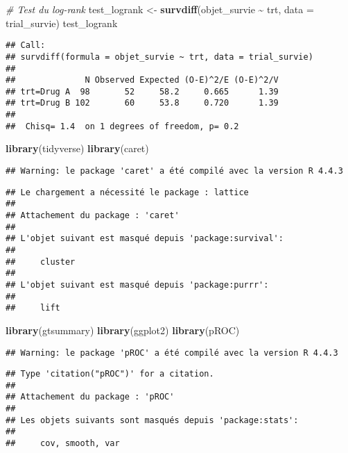 \documentclass[
]{article}
\newenvironment{Shaded}{\begin{snugshade}}{\end{snugshade}}
\newcommand{\AttributeTok}[1]{\textcolor[rgb]{0.13,0.29,0.53}{#1}}
\newcommand{\CommentTok}[1]{\textcolor[rgb]{0.56,0.35,0.01}{\textit{#1}}}
\newcommand{\FunctionTok}[1]{\textcolor[rgb]{0.13,0.29,0.53}{\textbf{#1}}}
\newcommand{\NormalTok}[1]{#1}
\newcommand{\OtherTok}[1]{\textcolor[rgb]{0.56,0.35,0.01}{#1}}
\newcommand{\SpecialCharTok}[1]{\textcolor[rgb]{0.81,0.36,0.00}{\textbf{#1}}}
\begin{document}
\begin{Shaded}
\begin{Highlighting}[]
\CommentTok{\# Test du log{-}rank}
\NormalTok{test\_logrank }\OtherTok{\textless{}{-}} \FunctionTok{survdiff}\NormalTok{(objet\_survie }\SpecialCharTok{\textasciitilde{}}\NormalTok{ trt, }\AttributeTok{data =}\NormalTok{ trial\_survie)}
\NormalTok{test\_logrank}
\end{Highlighting}
\end{Shaded}

\begin{verbatim}
## Call:
## survdiff(formula = objet_survie ~ trt, data = trial_survie)
## 
##              N Observed Expected (O-E)^2/E (O-E)^2/V
## trt=Drug A  98       52     58.2     0.665      1.39
## trt=Drug B 102       60     53.8     0.720      1.39
## 
##  Chisq= 1.4  on 1 degrees of freedom, p= 0.2
\end{verbatim}

\begin{Shaded}
\begin{Highlighting}[]
\FunctionTok{library}\NormalTok{(tidyverse)}
\FunctionTok{library}\NormalTok{(caret)}
\end{Highlighting}
\end{Shaded}

\begin{verbatim}
## Warning: le package 'caret' a été compilé avec la version R 4.4.3
\end{verbatim}

\begin{verbatim}
## Le chargement a nécessité le package : lattice
## 
## Attachement du package : 'caret'
## 
## L'objet suivant est masqué depuis 'package:survival':
## 
##     cluster
## 
## L'objet suivant est masqué depuis 'package:purrr':
## 
##     lift
\end{verbatim}

\begin{Shaded}
\begin{Highlighting}[]
\FunctionTok{library}\NormalTok{(gtsummary)}
\FunctionTok{library}\NormalTok{(ggplot2)}
\FunctionTok{library}\NormalTok{(pROC)}
\end{Highlighting}
\end{Shaded}

\begin{verbatim}
## Warning: le package 'pROC' a été compilé avec la version R 4.4.3
\end{verbatim}

\begin{verbatim}
## Type 'citation("pROC")' for a citation.
## 
## Attachement du package : 'pROC'
## 
## Les objets suivants sont masqués depuis 'package:stats':
## 
##     cov, smooth, var
\end{verbatim}
\end{document}
